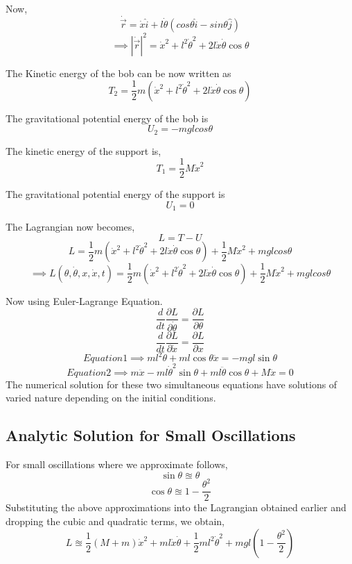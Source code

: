 \documentclass{article}
\begin{document}
	Now,
	\[ \dot{\vec{r}}  = \dot{x}\hat{i} + l\dot{\theta}( cos\theta \hat{i} - sin\theta\hat{j} ) \]
	\[ \implies |\dot{\vec{r}}|^2 = \dot{x}^2 + l^2 \dot{\theta}^2 + 2l\dot{x}\dot{\theta}\cos{\theta} \]	
	
	The Kinetic energy of the bob can be now written as 
	\[ T_2 = \frac{1}{2}m(\dot{x}^2 + l^2 \dot{\theta}^2 + 2l\dot{x}\dot{\theta}\cos{\theta}) \]
	
	The gravitational potential energy of the bob is
	\[ U_2 = -mglcos\theta \]
	
	The kinetic energy of the support is,
	\[ T_1 = \frac{1}{2}M\dot{x}^2 \]
	
	The gravitational potential energy of the support is
	\[ U_1 = 0\]
	
	The Lagrangian now becomes,
	\[ L = T -U \]
	\[ L =  \frac{1}{2}m(\dot{x}^2 + l^2 \dot{\theta}^2 + 2l\dot{x}\dot{\theta}\cos{\theta}) +  \frac{1}{2}M\dot{x}^2 + mglcos\theta  \]
	\[ \implies L(\theta,\dot{\theta},x,\dot{x},t) =  \frac{1}{2}m(\dot{x}^2 + l^2 \dot{\theta}^2 + 2l\dot{x}\dot{\theta}\cos{\theta}) +  \frac{1}{2}M\dot{x}^2 + mglcos\theta \]
	
	Now using Euler-Lagrange Equation.
	\begin{equation*}
		\frac{d}{dt}\frac{\partial L } {\partial \dot{\theta} } = \frac{\partial L}{\partial \theta} \tag{1}
	\end{equation*}
	\begin{equation*}
		\frac{d}{dt}\frac{\partial L } {\partial \dot{x} } = \frac{\partial L}{\partial x} \tag{2}
	\end{equation*}
	\begin{equation*}
		Equation 1 \implies ml^2\ddot{\theta} + ml\cos{\theta}\ddot{x}= -mgl\sin\theta	\tag{a}
	\end{equation*}
	\begin{equation*}
		Equation 2 \implies m\ddot{x} - ml\dot{\theta}^2\sin{\theta}+ ml\ddot{\theta} \cos\theta + M\ddot{x}	= 0 \tag{b}
	\end{equation*}
	The numerical solution for these two simultaneous equations have solutions of varied nature depending on the initial conditions.
	
	
	\subsection{Analytic Solution for Small Oscillations}
	For small oscillations where we approximate  follows,
	\[  \sin\theta \approxeq \theta\]
	\[  \cos\theta \approxeq 1 - \frac{\theta^2}{2}\]
	Substituting the above approximations into the Lagrangian obtained earlier and dropping the cubic and quadratic terms, we obtain,
	\[ L \approxeq \frac{1}{2}(M+m)\dot{x}^2 + ml\dot{x}\dot{\theta} + \frac{1}{2}ml^2\dot{\theta}^2 + mgl(1-\frac{\theta^2}{2}) \]
	 
\end{document}
